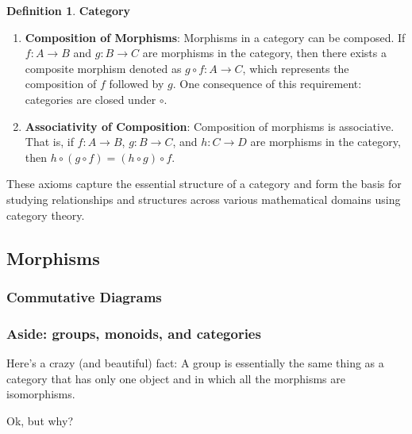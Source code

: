 \documentclass{article}
\theoremstyle{definition}
\newtheorem{definition}{Definition}[section]
\begin{document}
\begin{definition} {\bf Category}
\begin{enumerate} [label=(\roman*).]
\item {\bf Composition of Morphisms}: Morphisms in a category can
be composed. If $f: A \to B$ and $g: B \to C$ are morphisms in
the category, then there exists a composite morphism denoted as
$g \circ f: A \to C$, which represents the composition of $f$
followed by $g$. One consequence of this requirement: categories 
are closed under $\circ$.
 
\item {\bf Associativity of Composition}: Composition of
morphisms is associative. That is, if $f: A \to B$, $g: B \to C$,
and $h: C \to D$ are morphisms in the category, then $h \circ (g
\circ f) = (h \circ g) \circ f$.
\end{enumerate}

\medskip
\noindent
These axioms capture the essential structure of a category and
form the basis for studying relationships and structures across
various mathematical domains using category theory.

\label{definition:category}
\end{definition}

\subsection{Morphisms}
\label{subsection:morphisms}

\subsubsection{Commutative Diagrams}
\label{subsubsection:commutative_diagrams}
%
%
\begin{center}
\end{center}


\subsubsection{Aside: groups, monoids, and categories}
Here's a crazy (and beautiful) fact: A group is essentially the
same thing as a category that has only one object and in which
all the morphisms are isomorphisms.

\bigskip
\noindent
Ok, but why? 
\end{document}

